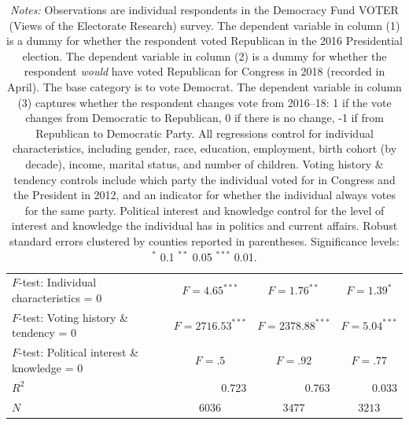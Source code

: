 \documentclass[manuscript,screen,nonacm,11pt,acm]{acmart}
\begin{document}
\begin{bibunit}
\begin{table}
\begin{adjustbox}{max width=1\textwidth}
\begin{tabular}{@{\hspace{0\tabcolsep}}l*{3}{D{.}{.}{-1}}@{\hspace{0\tabcolsep}}}
$ F $-test: Individual characteristics = 0&         &         &         \\
$ F $-test: Voting history \& tendency = 0&         &         &         \\
$ F $-test: Political interest \& knowledge = 0&         &         &         \\
$ R^2 $                            &   0.723         &   0.763         &   0.033         \\
$ N $                              &         &         &         \\
			\bottomrule
		\end{tabular}
	\end{adjustbox}
	\caption*{
		\small
		\emph{Notes:}
		Observations are individual respondents in the Democracy Fund VOTER (Views of the Electorate Research) survey.
		The dependent variable in column (1) is a dummy for whether the respondent voted Republican in the 2016 Presidential election.
		The dependent variable in column (2) is a dummy for whether the respondent \emph{would} have voted Republican for Congress in 2018 (recorded in April).
		The base category is to vote Democrat.
		The dependent variable in column (3) captures whether the respondent changes vote from 2016--18: 1 if the vote changes from Democratic to Republican, 0 if there is no change, -1 if from Republican to Democratic Party.
		All regressions control for individual characteristics, including gender, race, education, employment, birth cohort (by decade), income, marital status, and number of children.
		Voting history \& tendency controls include which party the individual voted for in Congress and the President in 2012, and an indicator for whether the individual always votes for the same party.
		Political interest and knowledge control for the level of interest and knowledge the individual has in politics and current affairs.
		Robust standard errors clustered by counties reported in parentheses.
		Significance levels: $^*$ 0.1 $^{**}$ 0.05 $^{***}$ 0.01.
	}
\end{table}


\end{bibunit}
\end{document}
